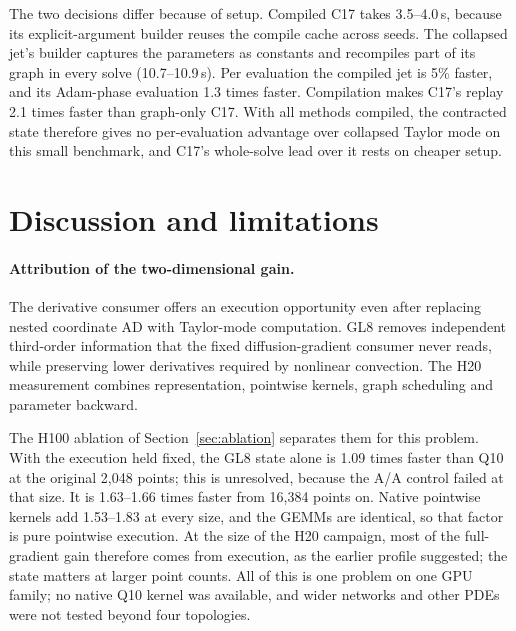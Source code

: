 \documentclass[11pt]{article}
\begin{document}
The two decisions differ because of setup. Compiled C17 takes 3.5--4.0\,s,
because its explicit-argument builder reuses the compile cache across
seeds. The collapsed jet's builder captures the parameters as constants and
recompiles part of its graph in every solve (10.7--10.9\,s). Per evaluation
the compiled jet is 5\% faster, and its Adam-phase evaluation 1.3 times
faster. Compilation makes C17's replay 2.1 times faster than graph-only
C17. With all methods compiled, the contracted state therefore gives no
per-evaluation advantage over collapsed Taylor mode on this small
benchmark, and C17's whole-solve lead over it rests on cheaper setup.

\section{Discussion and limitations}\label{sec:limits}
\paragraph{Attribution of the two-dimensional gain.}
The derivative consumer offers an execution opportunity even after
replacing nested coordinate AD with Taylor-mode computation. GL8 removes
independent third-order information that the fixed diffusion-gradient
consumer never reads, while preserving lower derivatives required by
nonlinear convection. The H20 measurement combines representation,
pointwise kernels, graph scheduling and parameter backward.

The H100 ablation of Section~\ref{sec:ablation} separates them for this
problem. With the execution held fixed, the GL8 state alone is 1.09 times
faster than Q10 at the original 2,048 points; this is unresolved, because
the A/A control failed at that size. It is 1.63--1.66 times faster from
16,384 points on. Native pointwise kernels add 1.53--1.83 at every size,
and the GEMMs are identical, so that factor is pure pointwise execution. At
the size of the H20 campaign, most of the full-gradient gain therefore
comes from execution, as the earlier profile suggested; the state matters
at larger point counts. All of this is one problem on one GPU family; no
native Q10 kernel was available, and wider networks and other PDEs were not
tested beyond four topologies.
\end{document}

